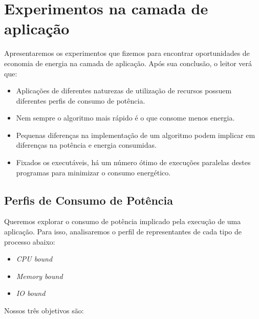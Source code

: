 \chapter{Experimentos na camada de aplicação}

Apresentaremos os experimentos que fizemos para encontrar oportunidades de economia de energia na camada de aplicação. Após sua conclusão, o leitor verá que:

\begin{itemize}
  \item Aplicações de diferentes naturezas de utilização de recursos possuem diferentes perfis de consumo de potência.

  \item Nem sempre o algoritmo mais rápido é o que consome menos energia.

  \item Pequenas diferenças na implementação de um algoritmo podem implicar em diferenças na potência e energia consumidas.

  \item Fixados os executáveis, há um número ótimo de execuções paralelas destes programas para minimizar o consumo energético.

\end{itemize}

\section{Perfis de Consumo de Potência}
\label{power_profiles}

Queremos explorar o consumo de potência implicado pela execução de uma aplicação. Para isso, analisaremos o perfil de representantes de cada tipo de processo abaixo:

\begin{itemize}
\item \emph{CPU bound}
\item \emph{Memory bound}
\item \emph{IO bound}
\end{itemize}

Nossos três objetivos são:

